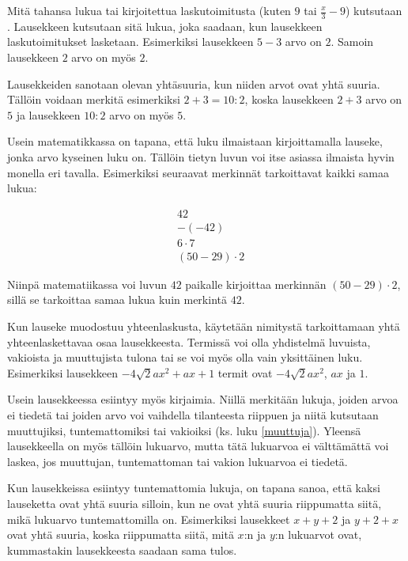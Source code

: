 Mitä tahansa lukua tai kirjoitettua laskutoimitusta (kuten $9$ tai $\frac{x}{3}-9$) kutsutaan . Lausekkeen  kutsutaan sitä lukua, joka saadaan, kun lausekkeen laskutoimitukset lasketaan. Esimerkiksi lausekkeen $5-3$ arvo on $2$. Samoin lausekkeen $2$ arvo on myös $2$.

Lausekkeiden sanotaan olevan yhtäsuuria, kun niiden arvot ovat yhtä suuria. Tällöin voidaan merkitä esimerkiksi $2+3=10:2$, koska lausekkeen $2+3$ arvo on $5$ ja lausekkeen $10:2$ arvo on myös $5$.

Usein matematikkassa on tapana, että luku ilmaistaan kirjoittamalla lauseke, jonka arvo kyseinen luku on. Tällöin tietyn luvun voi itse asiassa ilmaista hyvin monella eri tavalla. Esimerkiksi seuraavat merkinnät tarkoittavat kaikki samaa lukua:

\begin{align*}
                & 42 \\ & -(-42) \\ & 6 \cdot 7 \\ & (50-29) \cdot 2
\end{align*}

Niinpä matematiikassa voi luvun $42$ paikalle kirjoittaa merkinnän $(50-29)\cdot 2$, sillä se tarkoittaa samaa lukua kuin merkintä $42$.

Kun lauseke muodostuu yhteenlaskusta, käytetään nimitystä  tarkoittamaan yhtä yhteenlaskettavaa osaa lausekkeesta. Termissä voi olla yhdistelmä luvuista, vakioista ja muuttujista tulona tai se voi myös olla vain yksittäinen luku. Esimerkiksi lausekkeen $-4\sqrt{2}ax^2+ax+1$ termit ovat $-4\sqrt{2}ax^2$, $ax$ ja $1$.

Usein lausekkeessa esiintyy myös kirjaimia. Niillä merkitään lukuja, joiden arvoa ei tiedetä tai joiden arvo voi vaihdella tilanteesta riippuen ja niitä kutsutaan muuttujiksi, tuntemattomiksi tai vakioiksi (ks. luku \ref{muuttuja}). Yleensä lausekkeella on myös tällöin lukuarvo, mutta tätä lukuarvoa ei välttämättä voi laskea, jos muuttujan, tuntemattoman tai vakion lukuarvoa ei tiedetä.

Kun lausekkeissa esiintyy tuntemattomia lukuja, on tapana sanoa, että kaksi lauseketta ovat yhtä suuria silloin, kun ne ovat yhtä suuria riippumatta siitä, mikä lukuarvo tuntemattomilla on. Esimerkiksi lausekkeet $x+y+2$ ja $y+2+x$ ovat yhtä suuria, koska riippumatta siitä, mitä $x$:n ja $y$:n lukuarvot ovat, kummastakin lausekkeesta saadaan sama tulos.

